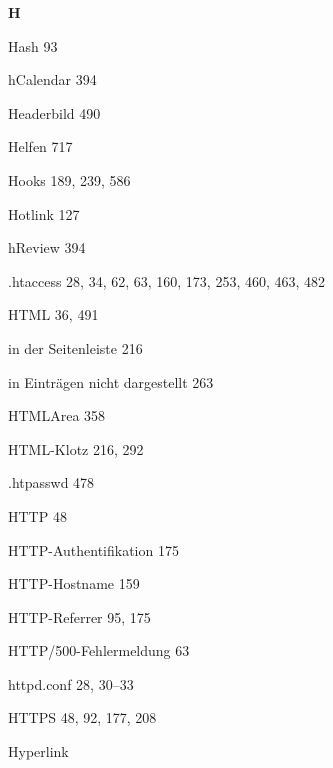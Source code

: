 \documentclass{book}
\renewcommand\indexspace{\vspace{11pt}}
\renewcommand\subitem{\par}
\begin{document}
\begin{multicols}{2}
\begin{osp-index}
  \indexspace
{\sffamily\bfseries H}\nopagebreak

  \item Hash\hspace{1mm} 93
  \item hCalendar\hspace{1mm} 394
  \item Headerbild\hspace{1mm} 490
  \item Helfen\hspace{1mm} 717
  \item Hooks\hspace{1mm} 189, 239, 586
  \item Hotlink\hspace{1mm} 127
  \item hReview\hspace{1mm} 394
  \item .htaccess\hspace{1mm} 28, 34, 62, 63, 160, 173, 253, 460, 463, 
		482
  \item HTML\hspace{1mm} 36, 491
    \subitem in der Seitenleiste\hspace{1mm} 216
    \subitem in Eintr\"agen nicht dargestellt\hspace{1mm} 263
  \item HTMLArea\hspace{1mm} 358
  \item HTML-Klotz\hspace{1mm} 216, 292
  \item .htpasswd\hspace{1mm} 478
  \item HTTP\hspace{1mm} 48
  \item HTTP-Authentifikation\hspace{1mm} 175
  \item HTTP-Hostname\hspace{1mm} 159
  \item HTTP-Referrer\hspace{1mm} 95, 175
  \item HTTP/500-Fehlermeldung\hspace{1mm} 63
  \item httpd.conf\hspace{1mm} 28, 30--33
  \item HTTPS\hspace{1mm} 48, 92, 177, 208
  \item Hyperlink\hspace{1mm} 


\end{osp-index}
\end{multicols}
\end{document}
